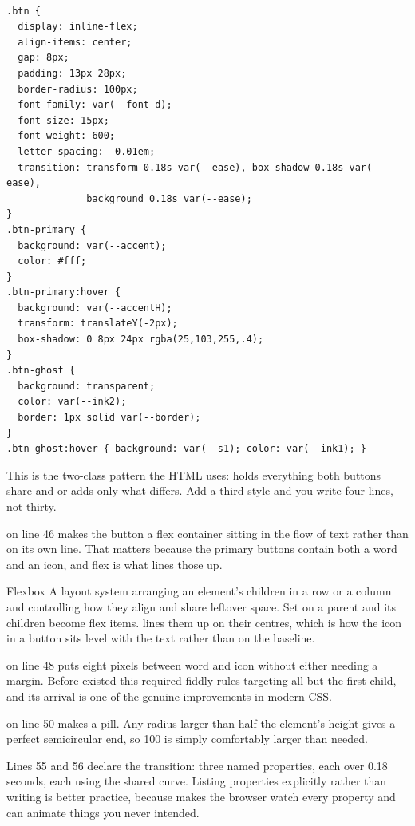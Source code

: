 \begin{lstlisting}[firstnumber=44,caption={\file{css/site.css}, lines 44--72}]

.btn {
  display: inline-flex;
  align-items: center;
  gap: 8px;
  padding: 13px 28px;
  border-radius: 100px;
  font-family: var(--font-d);
  font-size: 15px;
  font-weight: 600;
  letter-spacing: -0.01em;
  transition: transform 0.18s var(--ease), box-shadow 0.18s var(--ease),
              background 0.18s var(--ease);
}
.btn-primary {
  background: var(--accent);
  color: #fff;
}
.btn-primary:hover {
  background: var(--accentH);
  transform: translateY(-2px);
  box-shadow: 0 8px 24px rgba(25,103,255,.4);
}
.btn-ghost {
  background: transparent;
  color: var(--ink2);
  border: 1px solid var(--border);
}
.btn-ghost:hover { background: var(--s1); color: var(--ink1); }
\end{lstlisting}

This is the two-class pattern the HTML uses:  holds everything both
buttons share and  or  adds only what differs.
Add a third style and you write four lines, not thirty.

 on line 46 makes the button a flex container sitting in
the flow of text rather than on its own line. That matters because the primary
buttons contain both a word and an icon, and flex is what lines those up.

\begin{jargon}{Flexbox}
A layout system arranging an element's children in a row or a column and
controlling how they align and share leftover space. Set  on a
parent and its children become flex items.  lines them up
on their centres, which is how the icon in a button sits level with the text rather
than on the baseline.
\end{jargon}

 on line 48 puts eight pixels between word and icon without either
needing a margin. Before  existed this required fiddly rules targeting
all-but-the-first child, and its arrival is one of the genuine improvements in
modern CSS.

 on line 50 makes a pill. Any radius larger than half the
element's height gives a perfect semicircular end, so 100 is simply comfortably
larger than needed.

Lines 55 and 56 declare the transition: three named properties, each over 0.18
seconds, each using the shared curve. Listing properties explicitly rather than
writing  is better practice, because  makes the
browser watch every property and can animate things you never intended.

